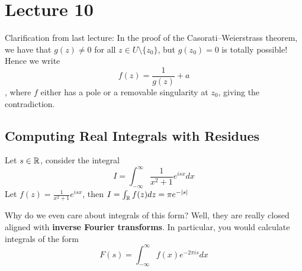 \section{Lecture 10}

Clarification from last lecture: In the proof of the Casorati–Weierstrass theorem, we have that $g(z) \neq 0$ for all $z \in U\setminus \{z_0\}$, but $g(z_0) = 0$ is totally possible! Hence we write
\[f(z) = \frac{1}{g(z)} + a\]
, where $f$ either has a pole or a removable singularity at $z_0$, giving the contradiction.

\subsection{Computing Real Integrals with Residues}

\begin{example}
Let $s \in \mathbb{R}$, consider the integral
\[I = \int_{-\infty}^\infty \frac{1}{x^2 + 1} e^{isx} dx\]
Let $f(z) = \frac{1}{x^2 + 1} e^{isx}$, then $I = \int_{\mathbb{R}} f(z) dz = \pi e^{-|s|}$
\end{example}

\begin{remark}
Why do we even care about integrals of this form? Well, they are really closed aligned with \textbf{inverse Fourier transforms}. In particular, you would calculate integrals of the form
\[F(s) = \int_{-\infty}^\infty f(x) e^{-2\pi i s} dx\]
\end{remark}

